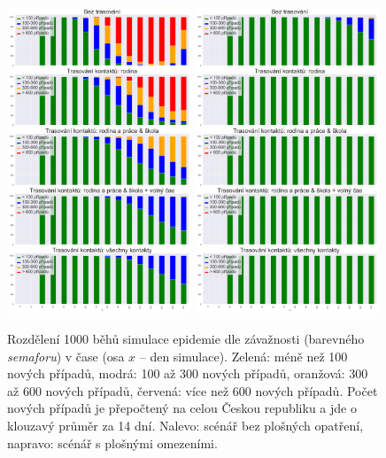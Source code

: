 \begin{figure}
  \centering
  \includegraphics[width=0.49\textwidth]{pic/bar_prubeh_history_second_exp.png}
  \hfill
  \includegraphics[width=0.49\textwidth]{pic/bar_prubeh_history_second_expB.png}
  \caption{Rozdělení 1000 běhů simulace epidemie dle závažnosti (barevného {\em
      semaforu}) v čase (osa $x$ -- den simulace). Zelená: méně než 100 nových
    případů, modrá: 100 až 300 nových případů, oranžová: 300 až 600 nových
    případů, červená: více než 600 nových případů. Počet nových případů je
    přepočtený na celou Českou republiku a jde o klouzavý průměr za 14
    dní. Nalevo: scénář bez plošných opatření, napravo: scénář s plošnými omezeními.}
  \label{pg:fig:exp1ab}
\end{figure}


